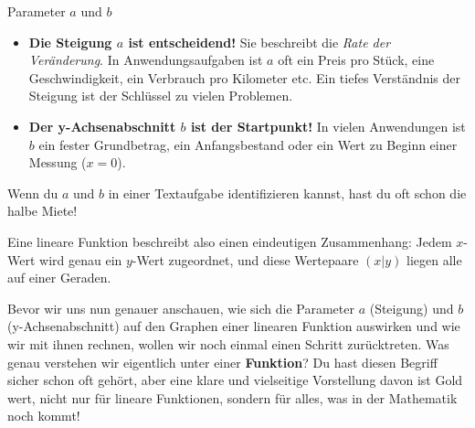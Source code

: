 \begin{warumwichtigumgebung}{Parameter $a$ und $b$}
\begin{itemize}
    \item \textbf{Die Steigung $a$ ist entscheidend!} Sie beschreibt die \textit{Rate der Veränderung}. In Anwendungsaufgaben ist $a$ oft ein Preis pro Stück, eine Geschwindigkeit, ein Verbrauch pro Kilometer etc. Ein tiefes Verständnis der Steigung ist der Schlüssel zu vielen Problemen.
    \item \textbf{Der y-Achsenabschnitt $b$ ist der Startpunkt!} In vielen Anwendungen ist $b$ ein fester Grundbetrag, ein Anfangsbestand oder ein Wert zu Beginn einer Messung ($x=0$).
\end{itemize}
Wenn du $a$ und $b$ in einer Textaufgabe identifizieren kannst, hast du oft schon die halbe Miete!
\end{warumwichtigumgebung}

Eine lineare Funktion beschreibt also einen eindeutigen Zusammenhang: Jedem $x$-Wert wird genau ein $y$-Wert zugeordnet, und diese Wertepaare $(x|y)$ liegen alle auf einer Geraden.



\bigskip %

Bevor wir uns nun genauer anschauen, wie sich die Parameter $a$ (Steigung) und $b$ (y-Achsenabschnitt) auf den Graphen einer linearen Funktion auswirken und wie wir mit ihnen rechnen, wollen wir noch einmal einen Schritt zurücktreten. Was genau verstehen wir eigentlich unter einer \textbf{Funktion}? Du hast diesen Begriff sicher schon oft gehört, aber eine klare und vielseitige Vorstellung davon ist Gold wert, nicht nur für lineare Funktionen, sondern für alles, was in der Mathematik noch kommt!

